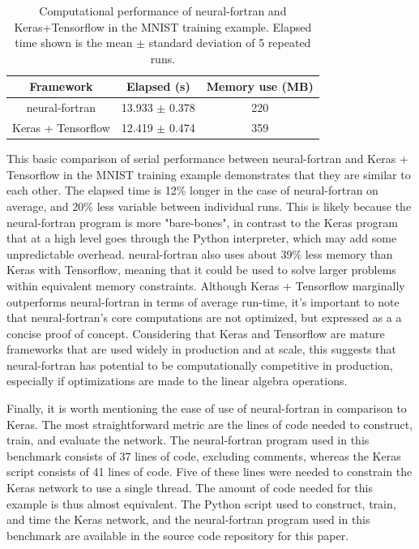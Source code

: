 \documentclass[sigplan, review=false, screen=true, balance=true]{acmart}
\begin{document}
\begin{center}
\begin{table}[h]
\caption{Computational performance of neural-fortran and Keras+Tensorflow
         in the MNIST training example. Elapsed time shown is the mean $\pm$
         standard deviation of 5 repeated runs.}
\label{serial_table}
\begin{tabular}{c|c|c}
  \hline
  Framework & Elapsed (s) & Memory use (MB) \\
  \hline
  neural-fortran     & 13.933 $\pm$ 0.378 & 220 \\
  Keras + Tensorflow & 12.419 $\pm$ 0.474 & 359 \\
  \hline
\end{tabular}
\end{table}
\end{center}

This basic comparison of serial performance between neural-fortran and
Keras + Tensorflow in the MNIST training example demonstrates that they are
similar to each other. The elapsed time is 12\% longer in the case
of neural-fortran on average, and 20\% less variable between individual runs.
This is likely because the neural-fortran program is more "bare-bones", in
contrast to the Keras program that at a high level goes through the Python
interpreter, which may add some unpredictable overhead. neural-fortran also
uses about 39\% less memory than Keras with Tensorflow, meaning that it could
be used to solve larger problems within equivalent memory constraints. Although
Keras + Tensorflow marginally outperforms neural-fortran in terms of average
run-time, it's important to note that neural-fortran's core computations are
not optimized, but expressed as a a concise proof of concept.
Considering that Keras and Tensorflow are mature frameworks that are used
widely in production and at scale, this suggests that neural-fortran has
potential to be computationally competitive in production, especially if
optimizations are made to the linear algebra operations.

Finally, it is worth mentioning the ease of use of neural-fortran in comparison
to Keras. The most straightforward metric are the lines of code needed to
construct, train, and evaluate the network. The neural-fortran program used
in this benchmark consists of 37 lines of code, excluding comments,
whereas the Keras script consists of 41 lines of code. Five of these lines
were needed to constrain the Keras network to use a single thread.
The amount of code needed for this example is thus almost equivalent.
The Python script used to construct, train, and time the Keras network,
and the neural-fortran program used in this benchmark are available in the
source code repository for this paper.
\end{document}
